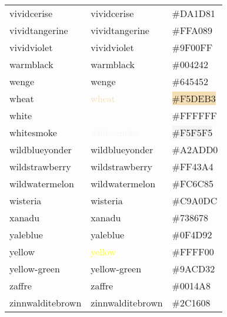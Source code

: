 \documentclass[
]{article}
\begin{document}
\begin{longtable}[]{@{}lll@{}}
vividcerise & \textcolor{vividcerise}{vividcerise} &
\colorbox{vividcerise}{\#DA1D81}\tabularnewline
vividtangerine & \textcolor{vividtangerine}{vividtangerine} &
\colorbox{vividtangerine}{\#FFA089}\tabularnewline
vividviolet & \textcolor{vividviolet}{vividviolet} &
\colorbox{vividviolet}{\#9F00FF}\tabularnewline
warmblack & \textcolor{warmblack}{warmblack} &
\colorbox{warmblack}{\#004242}\tabularnewline
wenge & \textcolor{wenge}{wenge} &
\colorbox{wenge}{\#645452}\tabularnewline
wheat & \textcolor{wheat}{wheat} &
\colorbox{wheat}{\#F5DEB3}\tabularnewline
white & \textcolor{white}{white} &
\colorbox{white}{\#FFFFFF}\tabularnewline
whitesmoke & \textcolor{whitesmoke}{whitesmoke} &
\colorbox{whitesmoke}{\#F5F5F5}\tabularnewline
wildblueyonder & \textcolor{wildblueyonder}{wildblueyonder} &
\colorbox{wildblueyonder}{\#A2ADD0}\tabularnewline
wildstrawberry & \textcolor{wildstrawberry}{wildstrawberry} &
\colorbox{wildstrawberry}{\#FF43A4}\tabularnewline
wildwatermelon & \textcolor{wildwatermelon}{wildwatermelon} &
\colorbox{wildwatermelon}{\#FC6C85}\tabularnewline
wisteria & \textcolor{wisteria}{wisteria} &
\colorbox{wisteria}{\#C9A0DC}\tabularnewline
xanadu & \textcolor{xanadu}{xanadu} &
\colorbox{xanadu}{\#738678}\tabularnewline
yaleblue & \textcolor{yaleblue}{yaleblue} &
\colorbox{yaleblue}{\#0F4D92}\tabularnewline
yellow & \textcolor{yellow}{yellow} &
\colorbox{electricyellow}{\#FFFF00}\tabularnewline
yellow-green & \textcolor{yellow-green}{yellow-green} &
\colorbox{yellow-green}{\#9ACD32}\tabularnewline
zaffre & \textcolor{zaffre}{zaffre} &
\colorbox{zaffre}{\#0014A8}\tabularnewline
zinnwalditebrown & \textcolor{zinnwalditebrown}{zinnwalditebrown} &
\colorbox{zinnwalditebrown}{\#2C1608}\tabularnewline
\bottomrule
\end{longtable}
\end{document}
